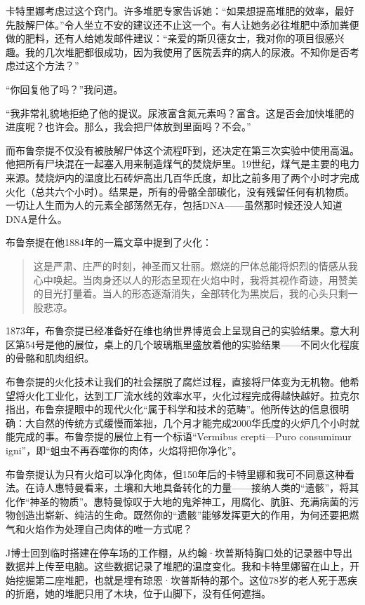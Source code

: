 \documentclass[12pt,oneside]{book}
\begin{document}
\begin{bookref}[frametitle={\cite{好好告别}}]
卡特里娜考虑过这个窍门。许多堆肥专家告诉她：“如果想提高堆肥的效率，最好先肢解尸体。”令人坐立不安的建议还不止这一个。有人让她务必往堆肥中添加粪便做的肥料，还有人给她发邮件建议：“亲爱的斯贝德女士，我对你的项目很感兴趣。我的几次堆肥都很成功，因为我使用了医院丢弃的病人的尿液。不知你是否考虑过这个方法？”

“你回复他了吗？”我问道。

“我非常礼貌地拒绝了他的提议。尿液富含氮元素吗？富含。这是否会加快堆肥的进度呢？也许会。那么，我会把尸体放到里面吗？不会。”

而布鲁奈提不仅没有被肢解尸体这个流程吓到，还决定在第三次实验中使用高温。他把所有尸块混在一起塞入用来制造煤气的焚烧炉里。19世纪，煤气是主要的电力来源。焚烧炉内的温度比石砖炉高出几百华氏度，却比之前多用了两个小时才完成火化（总共六个小时）。结果是，所有的骨骼全部碳化，没有残留任何有机物质。一切让人生而为人的元素全部荡然无存，包括DNA——虽然那时候还没人知道DNA是什么。

布鲁奈提在他1884年的一篇文章中提到了火化：

\begin{quotation}
这是严肃、庄严的时刻，神圣而又壮丽。燃烧的尸体总能将炽烈的情感从我心中唤起。当肉身还以人的形态呈现在火焰中时，我将其视作奇迹，用赞美的目光打量着。当人的形态逐渐消失，全部转化为黑炭后，我的心头只剩一股悲凉。
\end{quotation}

1873年，布鲁奈提已经准备好在维也纳世界博览会上呈现自己的实验结果。意大利区第54号是他的展位，桌上的几个玻璃瓶里盛放着他的实验结果——不同火化程度的骨骼和肌肉组织。

布鲁奈提的火化技术让我们的社会摆脱了腐烂过程，直接将尸体变为无机物。他希望将火化工业化，达到工厂流水线的效率水平，火化过程完成得越快越好。拉克尔指出，布鲁奈提眼中的现代火化“属于科学和技术的范畴”。他所传达的信息很明确：大自然的传统方式缓慢而笨拙，几个月才能完成2000华氏度的火炉几个小时就能完成的事。布鲁奈提的展位上有一个标语“Vermibus erepti—Puro consumimur igni”，即“蛆虫不再吞噬你的肉体，火焰将把你净化”。

布鲁奈提认为只有火焰可以净化肉体，但150年后的卡特里娜和我可不同意这种看法。在诗人惠特曼看来，土壤和大地具备转化的力量——接纳人类的“遗骸”，将其化作“神圣的物质”。惠特曼惊叹于大地的鬼斧神工，用腐化、肮脏、充满病菌的污物创造出崭新、纯洁的生命。既然你的“遗骸”能够发挥更大的作用，为何还要把燃气和火焰作为处理自己肉体的唯一方式呢？

J博士回到临时搭建在停车场的工作棚，从约翰·坎普斯特胸口处的记录器中导出数据并上传至电脑。这些数据记录了堆肥的温度变化。我和卡特里娜留在山上，开始挖掘第二座堆肥，也就是埋有琼恩·坎普斯特的那个。这位78岁的老人死于恶疾的折磨，她的堆肥只用了木块，位于山脚下，没有任何遮挡。


\end{bookref}
\end{document}
